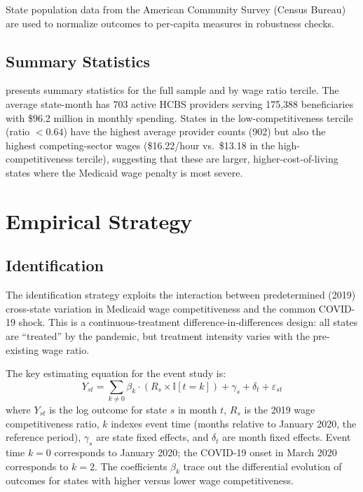 \documentclass[12pt]{article}
\newcommand{\ind}{\mathbb{I}}
\begin{document}
State population data from the American Community Survey (Census Bureau) are used to normalize outcomes to per-capita measures in robustness checks.

\subsection{Summary Statistics}

 presents summary statistics for the full sample and by wage ratio tercile. The average state-month has 703 active HCBS providers serving 175,388 beneficiaries with \$96.2 million in monthly spending. States in the low-competitiveness tercile (ratio $< 0.64$) have the highest average provider counts (902) but also the highest competing-sector wages (\$16.22/hour vs.\ \$13.18 in the high-competitiveness tercile), suggesting that these are larger, higher-cost-of-living states where the Medicaid wage penalty is most severe.




\section{Empirical Strategy}

\subsection{Identification}

The identification strategy exploits the interaction between predetermined (2019) cross-state variation in Medicaid wage competitiveness and the common COVID-19 shock. This is a continuous-treatment difference-in-differences design: all states are ``treated'' by the pandemic, but treatment intensity varies with the pre-existing wage ratio.

The key estimating equation for the event study is:
\begin{equation}
Y_{st} = \sum_{k \neq 0} \beta_k \cdot (R_s \times \ind[t = k]) + \gamma_s + \delta_t + \varepsilon_{st}
\label{eq:eventstudy}
\end{equation}
where $Y_{st}$ is the log outcome for state $s$ in month $t$, $R_s$ is the 2019 wage competitiveness ratio, $k$ indexes event time (months relative to January 2020, the reference period), $\gamma_s$ are state fixed effects, and $\delta_t$ are month fixed effects. Event time $k = 0$ corresponds to January 2020; the COVID-19 onset in March 2020 corresponds to $k = 2$. The coefficients $\beta_k$ trace out the differential evolution of outcomes for states with higher versus lower wage competitiveness.
\end{document}
